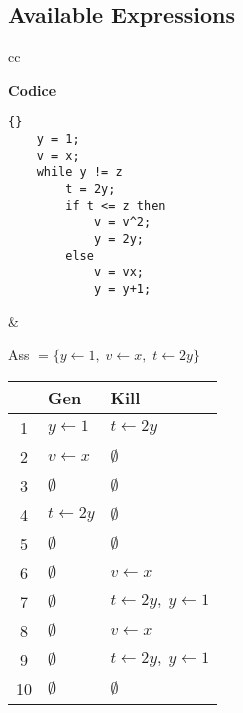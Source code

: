 \documentclass[a4paper,12pt,openany]{article}
\begin{document}
\subsection*{Available Expressions}
\begin{tabular}{cc}
\begin{minipage}{0.5\textwidth}
\textbf{Codice}
\begin{lstlisting}{}
    y = 1;
    v = x;
    while y != z
        t = 2y;
        if t <= z then
            v = v^2;
            y = 2y;
        else
            v = vx;
            y = y+1;
\end{lstlisting}
\end{minipage}&

\noindent
\begin{minipage}{0.5\textwidth}
Ass $= \{y\leftarrow1,\;v\leftarrow x,\;t\leftarrow2y\}$\\[0.5em]
\begin{tabular}{c | l | l}
    & Gen & Kill\\
    \hline
    1  & $y\leftarrow1$ & $t\leftarrow2y$\\
    2  & $v\leftarrow x$ & $\emptyset$\\
    3  & $\emptyset$ & $\emptyset$\\
    4  & $t\leftarrow2y$ & $\emptyset$\\
    5  & $\emptyset$ & $\emptyset$\\
    6  & $\emptyset$ & $v\leftarrow x$\\
    7  & $\emptyset$ & $t\leftarrow2y,\; y\leftarrow1$\\
    8  & $\emptyset$ & $v\leftarrow x$\\
    9  & $\emptyset$ & $t\leftarrow2y,\; y\leftarrow1$\\
    10 & $\emptyset$ & $\emptyset$\\
\end{tabular}
\end{minipage}
\end{tabular}
\end{document}
